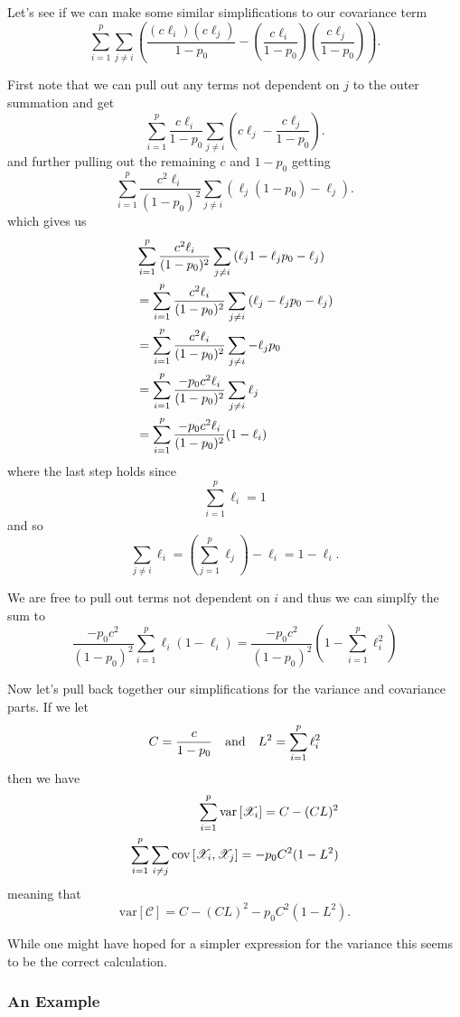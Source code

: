 \documentclass{book}
\begin{document}
Let's see if we can make some similar simplifications to our covariance term 
$$
\sum_{i=1}^{p}\sum_{j\neq i}\left(\frac{(c\ell_i)(c\ell_j)}{1-p_0}-\left(\frac{c\ell_i}{1-p_0}\right)\left(\frac{c\ell_j}{1-p_0}\right)\right).
$$

First note that we can pull out any terms not dependent on $j$ to the outer summation and get
$$
\sum_{i=1}^{p}\frac{c\ell_i}{1-p_0}\sum_{j\neq i}\left(c\ell_j-\frac{c\ell_j}{1-p_0}\right).
$$
and further pulling out the remaining $c$ and $1-p_0$ getting
$$
\sum_{i=1}^{p}\frac{c^2\ell_i}{(1-p_0)^2}\sum_{j\neq i}\left(\ell_j(1-p_0)-\ell_j\right).
$$
which gives us
\begin{align}
&\sum_{i=1}^{p}\frac{c^2\ell_i}{(1-p_0)^2}\sum_{j\neq i}\left(\ell_j1-\ell_jp_0-\ell_j\right)\notag\\
&=\sum_{i=1}^{p}\frac{c^2\ell_i}{(1-p_0)^2}\sum_{j\neq i}\left(\ell_j-\ell_jp_0-\ell_j\right)\notag\\
&=\sum_{i=1}^{p}\frac{c^2\ell_i}{(1-p_0)^2}\sum_{j\neq i}-\ell_jp_0\notag\\
&=\sum_{i=1}^{p}\frac{-p_0c^2\ell_i}{(1-p_0)^2}\sum_{j\neq i}\ell_j\notag\\
&=\sum_{i=1}^{p}\frac{-p_0c^2\ell_i}{(1-p_0)^2}(1-\ell_i)\notag
\end{align}
where the last step holds since
$$
\sum_{i=1}^{p}\ell_i=1
$$
and so 
$$
\sum_{j\neq i}\ell_i=\left(\sum_{j=1}^{p}\ell_j\right)-\ell_i=1-\ell_i.
$$

We are free to pull out terms not dependent on $i$ and thus we can simplfy the sum to 
$$
\frac{-p_0c^2}{(1-p_0)^2}\sum_{i=1}^{p}\ell_i(1-\ell_i)=\frac{-p_0c^2}{(1-p_0)^2}\left(1-\sum_{i=1}^{p}\ell_i^2\right)
$$

Now let's pull back together our simplifications for the variance and covariance parts. If we let
$$
C=\frac{c}{1-p_0}\text{\quad and\quad }L^2=\sum_{i=1}^{p}\ell_i^2
$$
then we have 
\begin{align}
\sum_{i=1}^{p}\text{var}\left[\mathscr{X}_i\right]=C-(CL)^2\notag\\
\sum_{i=1}^{p}\sum_{i \neq j}\text{cov}\left[\mathscr{X}_i,\mathscr{X}_j\right]=-p_0C^2(1-L^2)\notag
\end{align}
meaning that
$$
\text{var}\left[\mathscr{C}\right]=C-(CL)^2-p_0C^2(1-L^2).
$$

While one might have hoped for a simpler expression for the variance this seems to be the correct calculation. 

\subsubsection{An Example}
\end{document}
